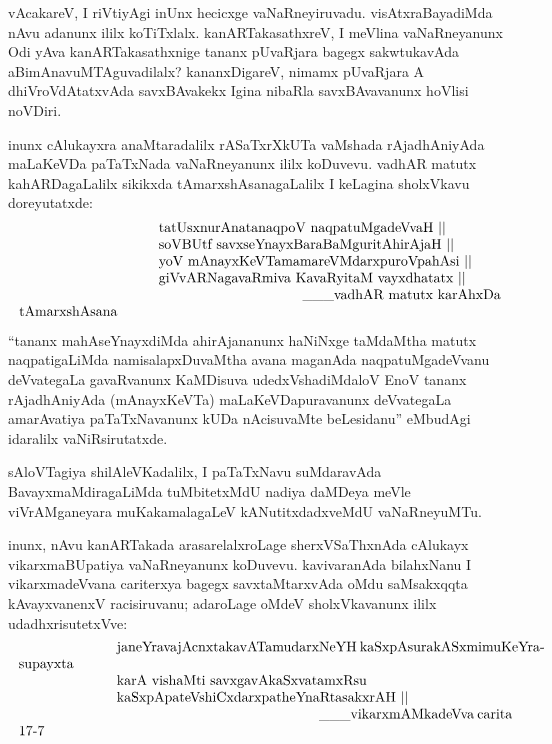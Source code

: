 \documentclass[11pt,a4size]{article}
\begin{document}
vAcakareV, I riVtiyAgi inUnx hecicxge
vaNaRneyiruvadu. visAtxraBayadiMda nAvu adanunx ililx
koTiTxlalx. kanARTakasathxreV, I meVlina vaNaRneyanunx Odi yAva
kanARTakasathxnige tananx pUvaRjara bagegx sakwtukavAda
aBimAnavuMTAguvadilalx? kananxDigareV, nimamx pUvaRjara A
dhiVroVdAtatxvAda savxBAvakekx Igina nibaRla savxBAvavanunx hoVlisi
noVDiri.

inunx cAlukayxra anaMtaradalilx rASaTxrXkUTa vaMshada rAjadhAniyAda
maLaKeVDa paTaTxNada vaNaRneyanunx ililx koDuvevu. vadhAR matutx
kahARDagaLalilx sikikxda tAmarxshAsanagaLalilx I keLagina sholxVkavu
doreyutatxde:
$$
\vbox{\parskip=0pt\parindent=0pt \everypar{\hskip10em} \obeylines
tatUsxnurAnatanaqpoV naqpatuMgadeVvaH\index{naqpatuMga} ||
soVBUtf savxseYnayxBaraBaMguritAhirAjaH ||
yoV mAnayxKeVTamamareVMdarxpuroVpahAsi ||
giVvARNagavaRmiva KavaRyitaM vayxdhatatx ||

\hspace{3.5cm} \_\_\_vadhAR matutx karAhxDa tAmarxshAsana}
$$
 
``tananx mahAseYnayxdiMda ahirAjananunx haNiNxge taMdaMtha matutx
naqpatigaLiMda namisalapxDuvaMtha avana maganAda naqpatuMgadeVvanu
deVvategaLa gavaRvanunx KaMDisuva udedxVshadiMdaloV EnoV tananx
rAjadhAniyAda (mAnayxKeVTa) maLaKeVDapuravanunx deVvategaLa
amarAvatiya paTaTxNavanunx kUDa nAcisuvaMte beLesidanu'' eMbudAgi
idaralilx vaNiRsirutatxde.

sAloVTagiya shilAleVKadalilx, I paTaTxNavu suMdaravAda
BavayxmaMdiragaLiMda tuMbitetxMdU nadiya daMDeya meVle viVrAMganeyara
muKakamalagaLeV kANutitxdadxveMdU vaNaRneyuMTu.

inunx, nAvu kanARTakada arasarelalxroLage sherxVSaThxnAda cAlukayx
vikarxmaBUpatiya vaNaRneyanunx koDuvevu. kavivaranAda bilahxNanu I
vikarxmadeVvana cariterxya bagegx savxtaMtarxvAda oMdu saMsakxqqta
kAvayxvanenxV racisiruvanu; adaroLage oMdeV sholxVkavanunx ililx
udadhxrisutetxVve: 
$$
\vbox{\parskip=0pt\parindent=0pt \everypar{\hskip7em} \obeylines
janeYravajAcnxtakavATamudarxNeYH kaSxpAsurakASxmimuKeYrasupayxta
karA vishaMti savxgavAkaSxvatamxRsu kaSxpApateVshiCxdarxpatheYnaRtasakxrAH ||

\hspace{5cm} \_\_\_vikarxmAMkadeVva carita 17-7}
$$
\end{document}
